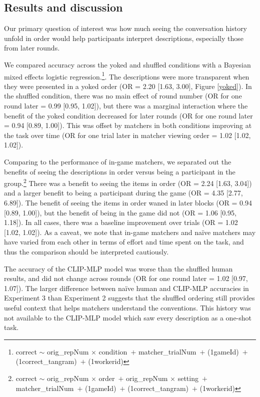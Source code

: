\documentclass[10pt, letterpaper]{article}
\begin{document}
\subsection{Results and discussion}\label{results-and-discussion-1}

Our primary question of interest was how much seeing the conversation
history unfold in order would help participants interpret descriptions,
especially those from later rounds.

We compared accuracy across the yoked and shuffled conditions with a
Bayesian mixed effects logistic regression.\footnote{correct \({\sim}\)
  orig\_repNum \({\times}\) condition~\({+}\) matcher\_trialNum~\({+}\)
  (1\textbar gameId)~\({+}\) (1\textbar correct\_tangram)~\({+}\)
  (1\textbar workerid)}. The descriptions were more transparent when
they were presented in a yoked order (OR = 2.20 {[}1.63, 3.00{]}, Figure
\ref{yoked}). In the shuffled condition, there was no main effect of
round number (OR for one round later = 0.99 {[}0.95, 1.02{]}), but there
was a marginal interaction where the benefit of the yoked condition
decreased for later rounds (OR for one round later = 0.94 {[}0.89,
1.00{]}). This was offset by matchers in both conditions improving at
the task over time (OR for one trial later in matcher viewing order =
1.02 {[}1.02, 1.02{]}).

Comparing to the performance of in-game matchers, we separated out the
benefits of seeing the descriptions in order versus being a participant
in the group.\footnote{correct \({\sim}\) orig\_repNum \({\times}\)
  order~\({+}\) orig\_repNum \({\times}\) setting~\({+}\)
  matcher\_trialNum~\({+}\) (1\textbar gameId)~\({+}\)
  (1\textbar correct\_tangram)~\({+}\) (1\textbar workerid)} There was a
benefit to seeing the items in order (OR = 2.24 {[}1.63, 3.04{]}) and a
larger benefit to being a participant during the game (OR = 4.35
{[}2.77, 6.89{]}). The benefit of seeing the items in order waned in
later blocks (OR = 0.94 {[}0.89, 1.00{]}), but the benefit of being in
the game did not (OR = 1.06 {[}0.95, 1.18{]}). In all cases, there was a
baseline improvement over trials (OR = 1.02 {[}1.02, 1.02{]}). As a
caveat, we note that in-game matchers and naïve matchers may have varied
from each other in terms of effort and time spent on the task, and thus
the comparison should be interpreted cautiously.

The accuracy of the CLIP-MLP model was worse than the shuffled human
results, and did not change across rounds (OR for one round later = 1.02
{[}0.97, 1.07{]}). The larger difference between naïve human and
CLIP-MLP accuracies in Experiment 3 than Experiment 2 suggests that the
shuffled ordering still provides useful context that helps matchers
understand the conventions. This history was not available to the
CLIP-MLP model which saw every description as a one-shot task.
\end{document}
